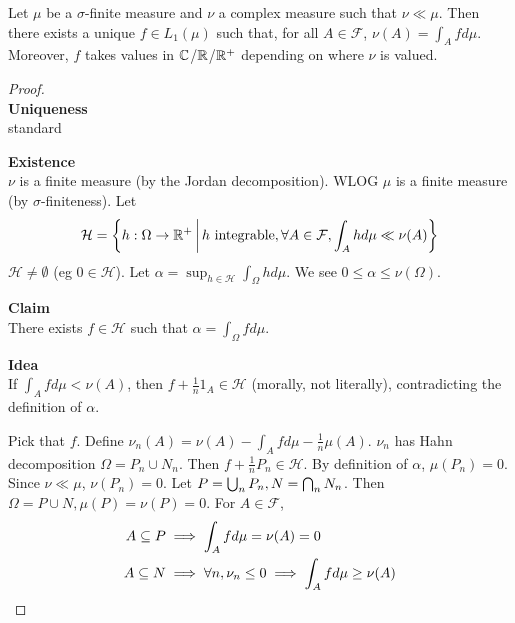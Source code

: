 \documentclass{article}
\begin{document}
\begin{nthm}\label{thm:rn}
  Let $\mu$ be a $\sigma$-finite measure and $\nu$ a complex measure such that $\nu \ll \mu$. Then there exists a unique $f \in L_1(\mu)$ such that, for all $A \in \mathcal F$, $\nu(A) = \int_A f d\mu$. Moreover, $f$ takes values in $\mathbb C$/$\mathbb R$/$\mathbb R^+$ depending on where $\nu$ is valued.
\end{nthm}
\begin{proof}~\\
  {\bf Uniqueness} \\
  standard

  {\bf Existence} \\
  $\nu$ is a finite measure (by the Jordan decomposition). WLOG $\mu$ is a finite measure (by $\sigma$-finiteness). Let
  $$\mathcal H = \left\{ h : \Omega \rightarrow \mathbb R^+ \,\middle|\, h \text{ integrable}, \forall A \in \mathcal F, \int_A h d\mu \ll \nu(A)\right\}$$
  $\mathcal H \ne \emptyset$ (eg $0 \in \mathcal H$). Let $\alpha = \sup_{h \in \mathcal H} \int_\Omega h d\mu$. We see $0 \le \alpha \le \nu(\Omega)$.

  {\bf Claim} \\
  There exists $f \in \mathcal H$ such that $\alpha = \int_\Omega f d\mu$.

  {\bf Idea} \\
  If $\int_A fd\mu < \nu(A)$, then $f + \frac 1 n 1_A \in \mathcal H$ (morally, not literally), contradicting the definition of $\alpha$.

  Pick that $f$. Define $\nu_n(A) = \nu(A) - \int_A fd\mu - \frac 1n \mu(A)$. $\nu_n$ has Hahn decomposition $\Omega = P_n \cup N_n$. Then $f + \frac 1n P_n \in \mathcal H$. By definition of $\alpha$, $\mu(P_n) = 0$. Since $\nu \ll \mu$, $\nu(P_n) = 0$. Let $P = \bigcup_n P_n, N = \bigcap_n N_n$. Then $\Omega = P \cup N, \mu(P) = \nu(P) = 0$. For $A \in \mathcal F$,
  \begin{align*}
    A \subseteq P & \implies \int_A fd\mu = \nu(A) = 0 \\
    A \subseteq N & \implies \forall n, \nu_n \le 0 \implies \int_A fd\mu \ge \nu(A)
  \end{align*}
\end{proof}
\end{document}
